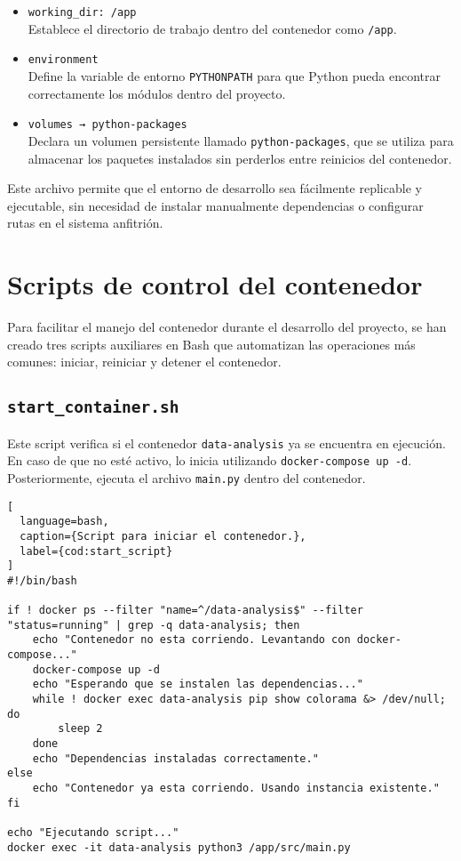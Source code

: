 \begin{itemize}
  \item \texttt{working\_dir: /app}\\
  Establece el directorio de trabajo dentro del contenedor como \texttt{/app}.

  \item \texttt{environment}\\
  Define la variable de entorno \texttt{PYTHONPATH} para que Python pueda encontrar correctamente los módulos dentro del proyecto.
  
  \item \texttt{volumes → python-packages}\\
  Declara un volumen persistente llamado \texttt{python-packages}, que se utiliza para almacenar los paquetes instalados sin perderlos entre reinicios del contenedor.
\end{itemize}

Este archivo permite que el entorno de desarrollo sea fácilmente replicable y ejecutable, sin necesidad de instalar manualmente dependencias o configurar rutas en el sistema anfitrión.
\newpage

\section{Scripts de control del contenedor}

Para facilitar el manejo del contenedor durante el desarrollo del proyecto, se han creado tres scripts auxiliares en Bash que automatizan las operaciones más comunes: iniciar, reiniciar y detener el contenedor.

\subsection{\texttt{start\_container.sh}}

Este script verifica si el contenedor \texttt{data-analysis} ya se encuentra en ejecución. En caso de que no esté activo, lo inicia utilizando \texttt{docker-compose up -d}. Posteriormente, ejecuta el archivo \texttt{main.py} dentro del contenedor.

\begin{lstlisting}[
  language=bash,
  caption={Script para iniciar el contenedor.},
  label={cod:start_script}
]
#!/bin/bash

if ! docker ps --filter "name=^/data-analysis$" --filter "status=running" | grep -q data-analysis; then
    echo "Contenedor no esta corriendo. Levantando con docker-compose..."
    docker-compose up -d
    echo "Esperando que se instalen las dependencias..."
    while ! docker exec data-analysis pip show colorama &> /dev/null; do
        sleep 2
    done
    echo "Dependencias instaladas correctamente."
else
    echo "Contenedor ya esta corriendo. Usando instancia existente."
fi

echo "Ejecutando script..."
docker exec -it data-analysis python3 /app/src/main.py
\end{lstlisting}

